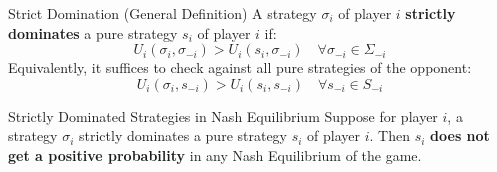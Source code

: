 \documentclass[12pt, a4paper]{article}
\begin{document}
\begin{defbox}{Strict Domination (General Definition)}
  A strategy $\sigma_i$ of player $i$ \textbf{strictly dominates} a pure strategy $s_i$ of player $i$ if:
  \[
    U_i(\sigma_i, \sigma_{-i}) > U_i(s_i, \sigma_{-i}) \quad \forall \sigma_{-i} \in \Sigma_{-i}
  \]
  Equivalently, it suffices to check against all pure strategies of the opponent:
  \[
    U_i(\sigma_i, s_{-i}) > U_i(s_i, s_{-i}) \quad \forall s_{-i} \in S_{-i}
  \]
\end{defbox}

\begin{thmbox}{Strictly Dominated Strategies in Nash Equilibrium}
  Suppose for player $i$, a strategy $\sigma_i$ strictly dominates a pure strategy $s_i$ of player $i$. Then $s_i$ \textbf{does not get a positive probability} in any Nash Equilibrium of the game.
\end{thmbox}
\end{document}
